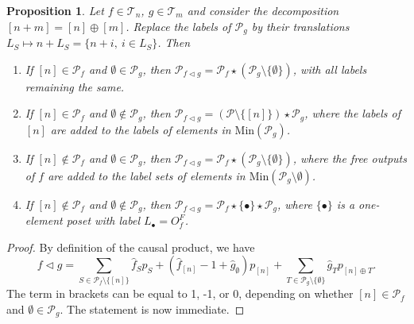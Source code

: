\documentclass[12pt]{article}
\newtheorem{prop}{Proposition}
\theoremstyle{definition}
\theoremstyle{remark}
\def\Te{\mathcal T}
\def\Pe{\mathcal P}
\def\vtl{\vartriangleleft}
\begin{document}
\begin{prop}\label{prop:vtl_ordinal} Let $f\in \Te_{n}$, $g\in \Te_{m}$
and
consider the decomposition $[n+m]=[n]\oplus[m]$. Replace the labels of $\Pe_g$ by their
translations $L_S\mapsto n+L_S=\{n+i,\ i\in L_S\}$.
Then  
\begin{enumerate}
\item[(a)] If $[n]\in \Pe_f$ and $\emptyset \in \Pe_g$, then $\Pe_{f\vtl g}=\Pe_f\star
(\Pe_g\setminus\{\emptyset\})$, with all labels remaining the same.
\item[(b)] If $[n]\in \Pe_f$ and $\emptyset \notin \Pe_g$, then $\Pe_{f\vtl
g}=(\Pe\setminus \{[n]\})\star \Pe_g$, where the labels of $[n]$ are added to the
labels of elements in $\mathrm{Min}(\Pe_g)$.
\item[(c)] If $[n]\notin \Pe_f$ and $\emptyset \in \Pe_g$, then $\Pe_{f\vtl g}=\Pe_f\star
(\Pe_g\setminus\{\emptyset\})$, where the free outputs  of $f$ are added to the label sets
of elements in $\mathrm{Min}(\Pe_g\setminus \emptyset)$.
\item[(d)] If $[n]\notin \Pe_f$ and $\emptyset \notin \Pe_g$, then $\Pe_{f\vtl
g}=\Pe_f\star \{\bullet\}\star \Pe_g$, where $\{\bullet\}$ is a one-element poset with
label $L_\bullet=O_f^F$.

\end{enumerate}

\end{prop}



\begin{proof} By definition of the causal product, we have  
\[
f\vtl g=\sum_{S\in \Pe_f\setminus\{[n]\}} \hat f_Sp_S+ (\hat f_{[n]}-1 + \hat
g_\emptyset)p_{[n]}+\sum_{T\in \Pe_g\setminus \{\emptyset\}} \hat g_T p_{[n]\oplus T}.
\]
The term in brackets can be equal to 1, -1, or 0, depending on whether $[n]\in \Pe_f$ and
$\emptyset\in \Pe_g$. The statement is now immediate.


\end{proof}
\end{document}

